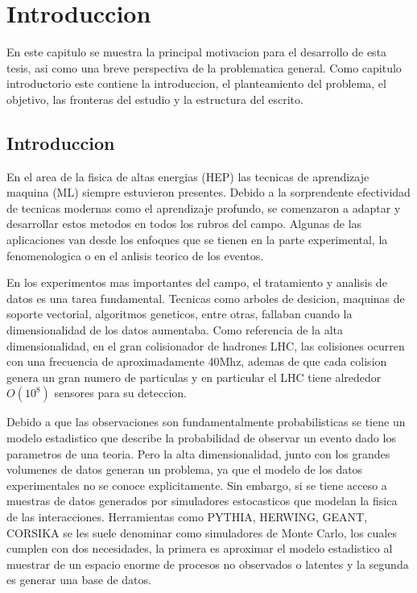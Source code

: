\chapter{Introduccion}

\label{Chapter1}

En este capitulo se muestra la principal motivacion para el desarrollo de esta tesis, 
asi como una breve perspectiva de la problematica general. Como capitulo introductorio este contiene la introduccion,
el planteamiento del problema, el objetivo, las fronteras del estudio y la estructura del escrito.

\section{Introduccion}

En el area de la fisica de altas energias (HEP) las tecnicas de aprendizaje maquina (ML) siempre estuvieron presentes. 
Debido a la sorprendente efectividad de tecnicas modernas como el aprendizaje profundo, 
se comenzaron a adaptar y desarrollar estos metodos en todos los rubros del campo. 
Algunas de las aplicaciones van desde los enfoques que se tienen en la parte experimental, la fenomenologica o en el anlisis teorico de los eventos.

En los experimentos mas importantes del campo, el tratamiento y analisis de datos es una tarea fundamental.
Tecnicas como arboles de desicion, maquinas de soporte vectorial, algoritmos geneticos, entre otras, 
fallaban cuando la dimensionalidad de los datos aumentaba.
Como referencia de la alta dimensionalidad, en el gran colisionador de hadrones LHC, las colisiones ocurren con una frecuencia de aproximadamente 40Mhz,
ademas de que cada colision genera un gran numero de particulas y en particular el LHC tiene alrededor $O(10^8)$ sensores para su deteccion.

Debido a que las observaciones son fundamentalmente probabilisticas se tiene un modelo 
estadistico que describe la probabilidad de observar un evento dado los parametros de una teoria.
Pero la alta dimensionalidad, junto con los grandes volumenes de datos generan un problema, ya que el 
modelo de los datos experimentales no se conoce explicitamente.
Sin embargo, si se tiene acceso a muestras de datos generados por simuladores estocasticos que modelan la fisica de las interacciones.
Herramientas como PYTHIA, HERWING, GEANT, CORSIKA se les suele denominar como simuladores de Monte Carlo, los cuales cumplen  con dos necesidades,
la primera es aproximar el modelo estadistico al muestrar de un espacio enorme de procesos no observados o latentes y la segunda es generar una base de datos.

